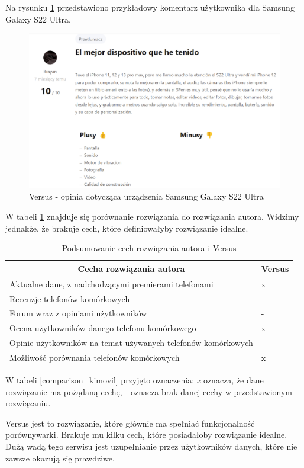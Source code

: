 Na rysunku \ref*{versus_4} przedstawiono przykładowy komentarz użytkownika dla Samsung Galaxy S22 Ultra.
\begin{figure}[H]
    \centering
    \includegraphics[width=15cm]{img/versus/versusKomentarze.png}
    \caption{Versus - opinia dotycząca urządzenia Samsung Galaxy S22 Ultra}
    \label{versus_4}
\end{figure}
W tabeli \ref{comparison_versus} znajduje się porównanie rozwiązania do rozwiązania autora. Widzimy jednakże, że brakuje cech, które definiowałyby rozwiązanie idealne.
\begin{table}[H]
    \centering
    \begin{tabular}{|l|l|}
        \hline
        \multicolumn{1}{|c|}{Cecha rozwiązania autora} & \multicolumn{1}{c|}{Versus} \\ \hline
        Aktualne dane, z nadchodzącymi premierami telefonami & x \\ \hline
        Recenzje telefonów komórkowych & - \\ \hline
        Forum wraz z opiniami użytkowników & - \\ \hline
        Ocena użytkowników danego telefonu komórkowego & x \\ \hline
        Opinie użytkowników na temat używanych telefonów komórkowych & - \\ \hline
        Możliwość porównania telefonów komórkowych & x \\ \hline
    \end{tabular}
    \caption{Podsumowanie cech rozwiązania autora i Versus}
    \label{comparison_versus}
\end{table}
W tabeli \ref{comparison_kimovil} przyjęto oznaczenia: \textit{x} oznacza, że dane rozwiązanie ma pożądaną cechę, \textit{-} oznacza brak danej cechy w przedstawionym rozwiązaniu.

Versus jest to rozwiązanie, które głównie ma spełniać funkcjonalność porównywarki. Brakuje mu kilku cech, które posiadałoby rozwiązanie idealne. Dużą wadą tego serwisu jest uzupełnianie przez użytkowników danych, które nie zawsze okazują się prawdziwe.
